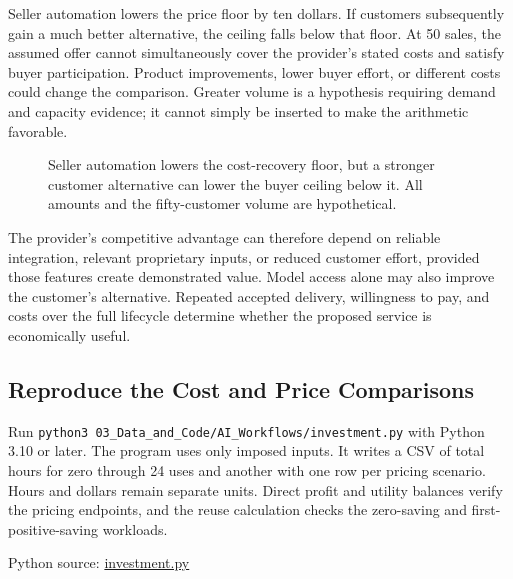 Seller automation lowers the price floor by ten dollars. If customers
subsequently gain a much better alternative, the ceiling falls below
that floor. At 50 sales, the assumed offer cannot simultaneously cover
the provider's stated costs and satisfy buyer participation. Product
improvements, lower buyer effort, or different costs could change the
comparison. Greater volume is a hypothesis requiring demand and capacity
evidence; it cannot simply be inserted to make the arithmetic favorable.

\begin{figure}[htbp]
\centering

\caption{Seller automation lowers the cost-recovery floor, but a stronger customer alternative can lower the buyer ceiling below it. All amounts and the fifty-customer volume are hypothetical.}\label{fig:M08_ai_price_bounds}
\end{figure}

The provider's competitive advantage can therefore depend on reliable
integration, relevant proprietary inputs, or reduced customer effort,
provided those features create demonstrated value. Model access alone
may also improve the customer's alternative. Repeated accepted delivery,
willingness to pay, and costs over the full lifecycle determine whether
the proposed service is economically useful.

\hypertarget{M08-reproduce-the-cost-and-price-comparisons}{%
\subsection{Reproduce the Cost and Price
Comparisons}\label{M08-reproduce-the-cost-and-price-comparisons}}

\noindent \noindent Run
\texttt{python3\ 03\_Data\_and\_Code/AI\_Workflows/investment.py} with
Python 3.10 or later. The program uses only imposed inputs. It writes a
CSV of total hours for zero through 24 uses and another with one row per
pricing scenario. Hours and dollars remain separate units. Direct profit
and utility balances verify the pricing endpoints, and the reuse
calculation checks the zero-saving and first-positive-saving workloads.

\FloatBarrier
{}
Python source:
\href{../03_Data_and_Code/AI_Workflows/investment.py}{investment.py}

